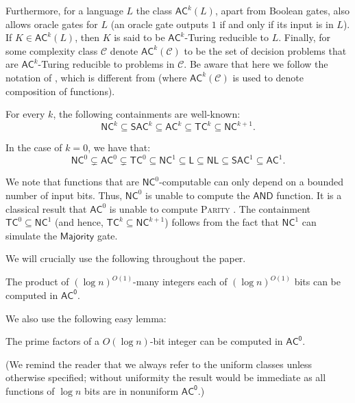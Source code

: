 \documentclass{theoretics}
\newcommand{\algprobm}[1]{\textsc{#1}\xspace}
\newcommand*{\ComplexityClass}[1]{\ensuremath{\mathsf{#1}}\xspace}
\newcommand*{\LogSpace}{\ComplexityClass{L}}
\newcommand{\AC}{\ComplexityClass{AC}}
\newcommand{\SAC}{\ComplexityClass{SAC}}
\newcommand{\ACz}{\ComplexityClass{AC^0}}
\begin{document}
Furthermore, for a language $L$ the class $\AC^k(L)$, apart from Boolean gates, also allows oracle gates for $L$ (an oracle gate outputs $1$ if and only if its input is in $L$).
If $K\in \AC^k(L)$, then $K$ is said to be $\AC^k$-Turing reducible to $L$.
Finally, for some complexity class $\mathcal{C}$ denote $\AC^k(\mathcal{C})$ to be the set of decision problems that are $\AC^k$-Turing reducible to problems in $\mathcal{C}$. 
Be aware that here we follow the notation of \cite{VollmerText}, which is different from \cite{WagnerThesis,GrochowLevetWL} (where $\AC^k(\mathcal{C})$ is used to denote composition of functions).

For every $k$, the following containments are well-known:
\[
\mathsf{NC}^{k} \subseteq \SAC^k \subseteq  \AC^{k} \subseteq \mathsf{TC}^{k} \subseteq \mathsf{NC}^{k+1}.
\]

\noindent In the case of $k = 0$, we have that:
\[
\mathsf{NC}^{0} \subsetneq \AC^{0} \subsetneq \mathsf{TC}^{0} \subseteq \mathsf{NC}^{1} \subseteq \LogSpace \subseteq \mathsf{NL} \subseteq \mathsf{SAC}^{1} \subseteq \AC^{1}.
\]

\noindent We note that functions that are $\mathsf{NC}^{0}$-computable can only depend on a bounded number of input bits. Thus, $\mathsf{NC}^{0}$ is unable to compute the $\mathsf{AND}$ function. It is a classical result that $\AC^{0}$ is unable to compute \algprobm{Parity} \cite{Smolensky87algebraicmethods}. The containment $\mathsf{TC}^{0} \subseteq \mathsf{NC}^{1}$ (and hence, $\mathsf{TC}^{k} \subseteq \mathsf{NC}^{k+1}$) follows from the fact that $\mathsf{NC}^{1}$ can simulate the $\mathsf{Majority}$ gate. 

We will crucially use the following throughout the paper.

\begin{theorem} \label{lem:multiplication}
The product of $(\log n)^{O(1)}$-many integers each of $(\log n)^{O(1)}$ bits can be computed in $\ACz$.
\end{theorem}

We also use the following easy lemma:

\begin{lemma} \label{lem:factor}
The prime factors of a $O(\log n)$-bit integer can be computed in \ACz.
\end{lemma}

(We remind the reader that we always refer to the uniform classes unless otherwise specified; without uniformity the result would be immediate as all functions of $\log n$ bits are in nonuniform $\ACz$.)
\end{document}
